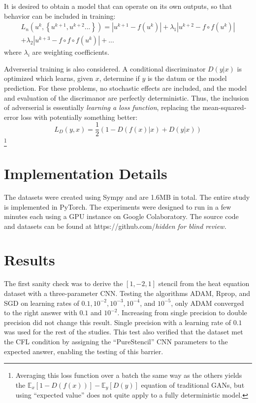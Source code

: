 \documentclass{article}
\begin{document}
It is desired to obtain a model that can operate on its own outputs, so that behavior can be included in training:
\begin{eqnarray}
L_n\left(u^k,\left\{u^{k+1},u^{k+2}...\right\}\right) =  \left| u^{k+1}-f(u^k) \right| + \lambda_1  \left| u^{k+2}-f \circ f(u^k) \right| \nonumber \\+ \lambda_2  \left| u^{k+3}-f \circ f \circ f(u^k) \right| + ...
\end{eqnarray}
where $\lambda_i$ are weighting coefficients. 

Adverserial training is also considered. A conditional discriminator $D(y|x)$ is optimized which learns, given $x$, determine if $y$ is the datum or the model prediction. For these problems, no stochastic effects are included, and the model and evaluation of the discrimanor are perfectly deterministic. Thus, the inclusion of adverserial is essentially {\em learning a loss function}, replacing the mean-squared-error loss with potentially something better:
\begin{equation}
L_D(y,x)= \frac{1}{2}\left(1 - D\left(f(x)|x\right) + D\left(y|x\right)\right)
\end{equation}
\footnote{Averaging this loss function over a batch the same way as the others yields the $\mathbb{E}_x[1-D(f(x))]-\mathbb{E}_y[D(y)]$ equation of traditional GANs, but using ``expected value'' does not quite apply to a fully deterministic model.}

\section{Implementation Details}

The datasets were created using Sympy and are 1.6MB in total. The entire study is implemented in PyTorch. The experiments were designed to run in a few minutes each using a GPU instance on Google Colaboratory. The source code and datasets can be found at https://github.com/{\em hidden for blind review.}


\section{Results}

The first sanity check was to derive the $[1,-2,1]$ stencil from the heat equation dataset with a three-parameter CNN.
Testing the algorithms ADAM, Rprop, and SGD on learning rates of $0.1, 10^{-2}, 10^{-3}, 10^{-4}$, and $10^{-5}$, only ADAM converged to the right answer with $0.1$ and $10^{-2}$. Increasing from single precision to double precision did not change this result. Single precision with a learning rate of $0.1$ was used for the rest of the studies.
This test also verified that the dataset met the CFL condition by assigning the ``PureStencil'' CNN parameters to the expected answer, enabling the testing of this barrier.
\end{document}
